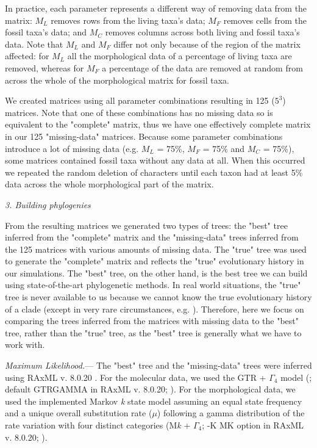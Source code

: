 \documentclass[12pt,letterpaper]{article}
\renewcommand{\subsection}[1]{%
\bigskip
\begin{center}
\begin{large}
\normalfont\itshape #1
\end{large}
\end{center}}
\renewcommand{\subsubsection}[1]{%
\vspace{2ex}
\noindent
\textit{#1.}---}
\begin{document}
In practice, each parameter represents a different way of removing data from the matrix: $M_{L}$ removes rows from the living taxa's data; $M_{F}$ removes cells from the fossil taxa's data; and $M_{C}$ removes columns across both living and fossil taxa's data. Note that $M_{L}$ and $M_{F}$ differ not only because of the region of the matrix affected: for $M_{L}$ all the morphological data of a percentage of living taxa are removed, whereas for $M_{F}$ a percentage of the data are removed at random from across the whole of the morphological matrix for fossil taxa.

We created matrices using all parameter combinations resulting in 125 ($5^3$) matrices. Note that one of these combinations has no missing data so is equivalent to the "complete" matrix, thus we have one effectively complete matrix in our 125 "missing-data" matrices. Because some parameter combinations introduce a lot of missing data (e.g. $M_L$ = 75\%, $M_F$ = 75\% and $M_C$ = 75\%), some matrices contained fossil taxa without any data at all. When this occurred we repeated the random deletion of characters until each taxon had at least 5\% data across the whole morphological part of the matrix.


\subsection{3. Building phylogenies}
From the resulting matrices we generated two types of trees: the "best" tree inferred from the "complete" matrix and the "missing-data" trees inferred from the 125 matrices with various amounts of missing data. The "true" tree was used to generate the "complete" matrix and reflects the "true" evolutionary history in our simulations. The "best" tree, on the other hand, is the best tree we can build using state-of-the-art phylogenetic methods. In real world situations, the "true" tree is never available to us because we cannot know the true evolutionary history of a clade (except in very rare circumstances, e.g. \citealt{rozen2005}). Therefore, here we focus on comparing the trees inferred from the matrices with missing data to the "best" tree, rather than the "true" tree, as the "best" tree is generally what we have to work with.

\subsubsection{Maximum Likelihood}
The "best" tree and the "missing-data" trees were inferred using RAxML v. 8.0.20 \citep{Stamatakis21012014}. For the molecular data, we used the GTR + $\Gamma_4$ model (\citealt{tavare1986}; default GTRGAMMA in RAxML v. 8.0.20; \citealt{Stamatakis21012014}). For the morphological data, we used the implemented Markov \textit{k} state model \citep{lewisa2001} assuming an equal state frequency and a unique overall substitution rate ($\mu$) following a gamma distribution of the rate variation with four distinct categories (M\textit{k} + $\Gamma_4$; -K MK option in RAxML v. 8.0.20; \citealt{Stamatakis21012014}).
\end{document}
